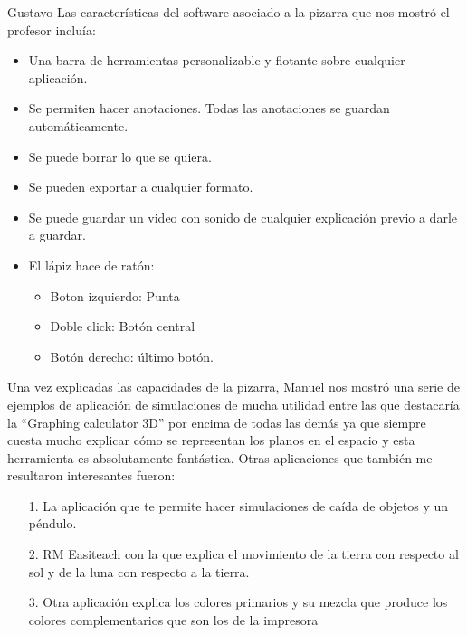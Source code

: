 \begin{opin}{\guscolor}{Gustavo}
Las características del software asociado a la pizarra que nos mostró el profesor incluía:

\begin{itemize}
\item Una barra de herramientas personalizable y flotante sobre cualquier aplicación.  

\item Se permiten hacer anotaciones. Todas las anotaciones se guardan automáticamente.  

\item Se puede borrar lo que se quiera.  

\item Se pueden exportar a cualquier formato.  

\item Se puede guardar un video con sonido de cualquier explicación previo a darle a guardar. 

\item El lápiz hace de ratón: 
\begin{itemize}

\item Boton izquierdo: Punta 

\item Doble click: Botón central 

\item Botón derecho: último botón. 
\end{itemize}
\end{itemize}

Una vez explicadas las capacidades de la pizarra, Manuel nos mostró una serie de ejemplos de aplicación de simulaciones de mucha utilidad entre las que destacaría la “Graphing  calculator 3D” por encima de todas las demás ya que siempre cuesta mucho explicar cómo se representan los planos en el espacio y esta herramienta es absolutamente fantástica. Otras aplicaciones que también me resultaron interesantes fueron:
\begin{itemize}
\item[1.]La aplicación que te permite hacer simulaciones de caída de objetos y un péndulo. 

\item[2.]RM Easiteach con la que explica el movimiento de la tierra con respecto al sol y de la luna con respecto a la tierra. 

\item[3.]Otra aplicación explica los colores primarios y su mezcla que produce los colores complementarios que son los de la impresora 
\end{itemize}


\end{opin}
